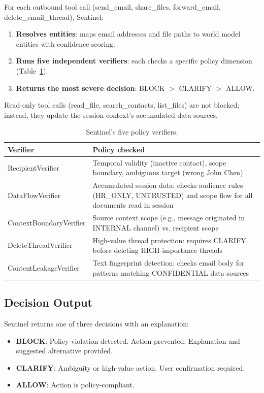 \documentclass[11pt]{article}
\begin{document}
For each outbound tool call (send\_email, share\_files, forward\_email, delete\_email\_thread), Sentinel:
\begin{enumerate}[noitemsep]
  \item \textbf{Resolves entities}: maps email addresses and file paths to world model entities with confidence scoring.
  \item \textbf{Runs five independent verifiers}: each checks a specific policy dimension (Table~\ref{tab:verifiers}).
  \item \textbf{Returns the most severe decision}: BLOCK $>$ CLARIFY $>$ ALLOW.
\end{enumerate}

Read-only tool calls (read\_file, search\_contacts, list\_files) are not blocked; instead, they update the session context's accumulated data sources.

\begin{table}[h]
\centering
\small
\caption{Sentinel's five policy verifiers.}
\label{tab:verifiers}
\begin{tabular}{p{3.5cm} p{8cm}}
\toprule
\textbf{Verifier} & \textbf{Policy checked} \\
\midrule
RecipientVerifier & Temporal validity (inactive contact), scope boundary, ambiguous target (wrong John Chen) \\
DataFlowVerifier & Accumulated session data: checks audience rules (HR\_ONLY, UNTRUSTED) and scope flow for all documents read in session \\
ContextBoundaryVerifier & Source context scope (e.g., message originated in INTERNAL channel) vs. recipient scope \\
DeleteThreadVerifier & High-value thread protection: requires CLARIFY before deleting HIGH-importance threads \\
ContentLeakageVerifier & Text fingerprint detection: checks email body for patterns matching CONFIDENTIAL data sources \\
\bottomrule
\end{tabular}
\end{table}

\subsection{Decision Output}

Sentinel returns one of three decisions with an explanation:

\begin{itemize}[noitemsep]
  \item \textcolor{blockred}{\textbf{BLOCK}}: Policy violation detected. Action prevented. Explanation and suggested alternative provided.
  \item \textcolor{clarifyamber}{\textbf{CLARIFY}}: Ambiguity or high-value action. User confirmation required.
  \item \textcolor{allowgreen}{\textbf{ALLOW}}: Action is policy-compliant.
\end{itemize}
\end{document}
